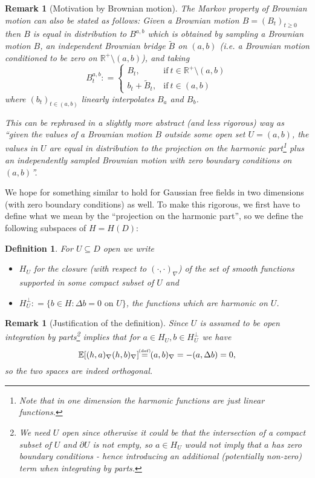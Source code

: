 \documentclass[11pt,reqno]{amsart}
\numberwithin{equation}{section}
\newtheorem{defi}[thm]{Definition}
\newtheorem{rem}[thm]{Remark}
\newcommand{\eqbydef}{\mathrel{\stackrel{\hspace*{-3mm}\text{\tiny(def)}\hspace*{-3mm}}{=}}}
\newcommand{\deq}{\mathrel{\mathop:}=}
\begin{document}
\begin{rem}[Motivation by Brownian motion]\label{rem:alternativeMarkovforBM}
	The Markov property of Brownian motion can also be stated as follows: Given a Brownian motion $B=(B_t)_{t\geq 0}$ then $B$ is equal in distribution to $B^{a,b}$ which is obtained by sampling a Brownian motion $B$, an independent Brownian bridge $\tilde B$ on $(a,b)$ (i.e. a Brownian motion conditioned to be zero on $\mathbb R^+\setminus(a,b)$), and taking
	$$B^{a,b}_t\deq \begin{cases}
      B_t, & \text{if}\ t\in\mathbb R^+\setminus(a,b) \\
      b_t+\tilde B_t, & \text{if}\ t\in(a,b)
    \end{cases}$$ where $(b_t)_{t\in(a,b)}$ linearly interpolates $B_a$ and $B_b$.
	
	This can be rephrased in a slightly more abstract (and less rigorous) way as ``given the values of a Brownian motion $B$ outside some open set $U=(a,b)$, the values in $U$ are equal in distribution to the projection on the harmonic part\footnote{Note that in one dimension the harmonic functions are just linear functions.} plus an independently sampled Brownian motion with zero boundary conditions on $(a,b)$''.
\end{rem}

We hope for something similar to hold for Gaussian free fields in two dimensions (with zero boundary conditions) as well. To make this rigorous, we first have to define what we mean by the ``projection on the harmonic part'', so we define the following subspaces of $H=H(D)$:

\begin{defi}
	For $U\subseteq D$ open we write \begin{itemize}
		\item $H_U$ for the closure (with respect to $(\cdot,\cdot)_\nabla$) of the set of smooth functions supported in some compact subset of $U$ and
		\item $H_U^\perp\deq \{b\in H: \Delta b=0 \text{ on }U\}$, the functions which are harmonic on $U$.
	\end{itemize}
\end{defi}

\begin{rem}[Justification of the definition]
	Since $U$ is assumed to be open integration by parts\footnote{We need $U$ open since otherwise it could be that the intersection of a compact subset of $U$ and $\partial U$ is not empty, so $a\in H_U$ would not imply that $a$ has zero boundary conditions - hence introducing an additional (potentially non-zero) term when integrating by parts.} implies that for $a\in H_U, b\in H_U^\perp$ we have $$\mathbb E[(h,a)_\nabla(h,b)_\nabla]\eqbydef (a,b)_\nabla = -(a,\Delta b)=0,$$
	so the two spaces are indeed orthogonal.
\end{rem}
\end{document}
